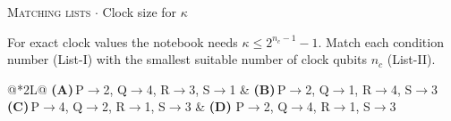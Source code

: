 \documentclass[11pt,a4paper]{article}
\newcommand{\optlabel}[1]{\textbf{(#1)}}
\newcommand{\correctlabel}[1]{\textcolor{okgreen}{\textbf{(#1)}\,\ding{51}}}
\newenvironment{qitem}[1]{\begin{list}{}{\setlength{\leftmargin}{3.3em}\setlength{\labelwidth}{3.1em}%
  \setlength{\labelsep}{0.2em}\setlength{\topsep}{3pt}\setlength{\parsep}{3pt}}\item[\textbf{Q.#1}\hfill]}{\end{list}}
\newcommand{\qmeta}[2]{{\footnotesize\color{black!60}\textsc{#1} \;$\cdot$\; #2}\par}
\begin{document}
\begin{qitem}{64}
\qmeta{Matching lists}{Clock size for $\kappa$}
For exact clock values the notebook needs $\kappa \le 2^{n_c - 1} - 1$. Match each condition number (List-I) with the smallest suitable number of clock qubits $n_c$
(List-II).
\par\smallskip{}
\par\smallskip\noindent\begin{tabularx}{\linewidth}{@{}*{2}{L}@{}}
\optlabel{A}\,P$\to$2, Q$\to$4, R$\to$3, S$\to$1 & \optlabel{B}\,P$\to$2, Q$\to$1, R$\to$4, S$\to$3 \\[3pt]
\optlabel{C}\,P$\to$4, Q$\to$2, R$\to$1, S$\to$3 & \correctlabel{D}\,P$\to$2, Q$\to$4, R$\to$1, S$\to$3
\end{tabularx}
\end{qitem}
\end{document}
